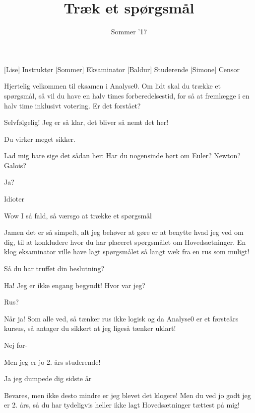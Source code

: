 \documentclass[a4paper,11pt]{article}
\title{Træk et spørgsmål}
\author{Sommer '17}
\begin{document}
\maketitle

\begin{roles}
[Lise] Instruktør
[Sommer] Eksaminator
[Baldur] Studerende
[Simone] Censor
\end{roles}



\begin{sketch}

 Hjertelig velkommen til eksamen i Analyse0. Om lidt skal du trække et spørgsmål, så vil du have en halv times forberedelsestid, for så at fremlægge i en halv time inklusivt votering. Er det forstået?

 Selvfølgelig! Jeg er så klar, det bliver så nemt det her!

 Du virker meget sikker.

 Lad mig bare sige det sådan her: Har du nogensinde hørt om Euler? Newton? Galois?

 Ja?

 Idioter

 Wow  I så fald, så værsgo at trække et spørgsmål 

 Jamen det er så simpelt, alt jeg behøver at gøre er at benytte hvad jeg ved om dig, til at konkludere hvor du har placeret spørgsmålet om Hovedsætninger. En klog eksaminator ville have lagt spørgsmålet så langt væk fra en rus som muligt!

 Så du har truffet din beslutning?

 Ha! Jeg er ikke engang begyndt! Hvor var jeg?

 Rus?

 Når ja! Som alle ved, så tænker rus ikke logisk og da Analyse0 er et førsteårs kursus, så antager du sikkert at jeg ligeså tænker uklart!

 Nej for- 

  Men jeg er jo 2. års studerende!

 Ja jeg dumpede dig sidste år

 Bevares, men ikke desto mindre er jeg blevet det klogere! Men du ved jo godt jeg er 2. års, så du har tydeligvis heller ikke lagt Hovedsætninger tættest på mig!


\end{sketch}
\end{document}
